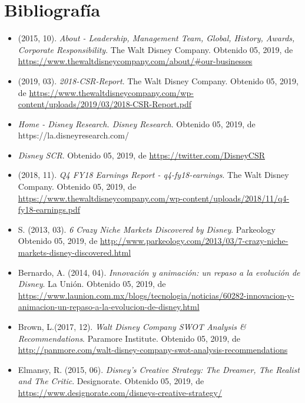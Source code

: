 \section{Bibliografía}

\begin{itemize}

\item
(2015, 10). \textit{About - Leadership, Management Team, Global, History, Awards, Corporate Responsibility}. The Walt Disney Company. Obtenido 05, 2019, de \url{https://www.thewaltdisneycompany.com/about/#our-businesses}

\item
(2019, 03). \textit{2018-CSR-Report}. The Walt Disney Company. Obtenido 05, 2019, de \url{https://www.thewaltdisneycompany.com/wp-content/uploads/2019/03/2018-CSR-Report.pdf}

\item
\textit{Home - Disney Research. Disney Research}. Obtenido 05, 2019, de https://la.disneyresearch.com/

\item
\textit{Disney SCR}. Obtenido 05, 2019, de \url{https://twitter.com/DisneyCSR}

\item
(2018, 11). \textit{Q4 FY18 Earnings Report - q4-fy18-earnings}. The Walt Disney Company. Obtenido 05, 2019, de \url{https://www.thewaltdisneycompany.com/wp-content/uploads/2018/11/q4-fy18-earnings.pdf}

\item
S. (2013, 03). \textit{6 Crazy Niche Markets Discovered by Disney}. Parkeology Obtenido 05, 2019, de \url{http://www.parkeology.com/2013/03/7-crazy-niche-markets-disney-discovered.html}

\item
Bernardo, A. (2014, 04).\textit{ Innovación y animación: un repaso a la evolución de Disney}. La Unión. Obtenido 05, 2019, de \url{https://www.launion.com.mx/blogs/tecnologia/noticias/60282-innovacion-y-animacion-un-repaso-a-la-evolucion-de-disney.html}

\item
Brown, L.(2017, 12). \textit{Walt Disney Company SWOT Analysis \& Recommendations}. Paramore Institute. Obtenido 05, 2019, de \url{http://panmore.com/walt-disney-company-swot-analysis-recommendations}

\item
Elmansy, R. (2015, 06). \textit{Disney’s Creative Strategy: The Dreamer, The Realist and The Critic}. Designorate. Obtenido 05, 2019, de \url{https://www.designorate.com/disneys-creative-strategy/}


\end{itemize}
